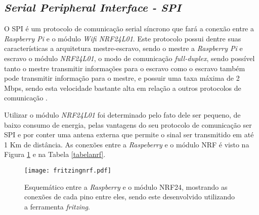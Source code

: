 \subsection{\emph{Serial Peripheral Interface - SPI}}
    O SPI é um protocolo de comunicação serial síncrono que fará a conexão entre a \emph{Raspberry Pi} e o módulo \emph{Wifi NRF24L01}. Este protocolo possui dentre suas características a arquitetura mestre-escravo, sendo o mestre a \emph{Raspberry Pi} e escravo o módulo \emph{NRF24L01}, o modo de comunicação \emph{full-duplex}, sendo possível tanto o mestre transmitir informações para o escravo como o escravo também pode transmitir informação para o mestre, e possuir uma taxa máxima de 2 Mbps, sendo esta velocidade bastante alta em relação a outros protocolos de comunicação \cite{spi2}.\par
    Utilizar o módulo \emph{NRF24L01} foi determinado pelo fato dele ser pequeno, de baixo consumo de energia, pelas vantagens do seu protocolo de comunicação ser SPI e por conter uma antena externa que permite o sinal ser transmitido em até 1 Km de distância.
    As conexões entre a \emph{Raspeberry} e o módulo NRF é visto na Figura \ref{fritizingnrf} e na Tabela \ref{tabelanrf}.  
    \begin{figure}[H]
    \centering
    \texttt{[image: fritzingnrf.pdf]}
    \caption{Esquemático entre a \emph{Raspberry} e o módulo NRF24, mostrando as conexões de cada pino entre eles, sendo este desenvolvido utilizando a ferramenta \emph{fritzing}.}
    \label{fritizingnrf}
\end{figure}  

